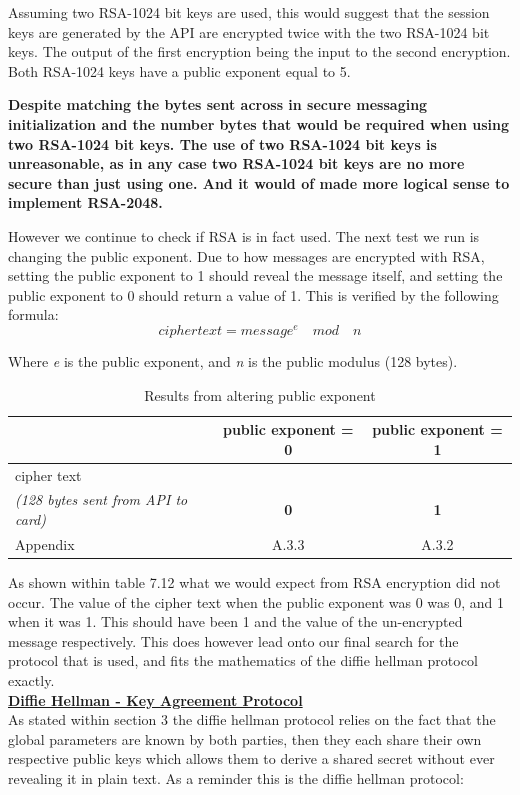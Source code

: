 \documentclass[bsc,frontabs,twoside,singlespacing,parskip,deptreport]{infthesis}     %
\begin{document}
Assuming two RSA-1024 bit keys are used, this would suggest that the session keys are generated by the API are encrypted twice with the two RSA-1024 bit keys. The output of the first encryption being the input to the second encryption. Both RSA-1024 keys have a public exponent equal to 5. 

\textbf{Despite matching the bytes sent across in secure messaging initialization and the number bytes that would be required when using two RSA-1024 bit keys. The use of two RSA-1024 bit keys is unreasonable, as in any case two RSA-1024 bit keys are no more secure than just using one. And it would of made more logical sense to implement RSA-2048.}

However we continue to check if RSA is in fact used. The next test we run is changing the public exponent. Due to how messages are encrypted with RSA, setting the public exponent to 1 should reveal the message itself, and setting the public exponent to 0 should return a value of 1. This is verified by the following formula:\\

$$ ciphertext = message^{e} \quad mod \quad n $$

Where \textit{e} is the public exponent, and \textit{n} is the public modulus (128 bytes).\\


\begin{table}[H]
\begin{tabular}{|l|c|c|}
\hline
& public exponent = 0 & public exponent = 1\\
\hline
cipher text & &\\
\textit{(128 bytes sent from API to card)} & \textbf{0} & \textbf{1} \\

\hline
Appendix & A.3.3 & A.3.2 \\
\hline
\end{tabular}
\caption{Results from altering public exponent}
\end{table}

As shown within table 7.12 what we would expect from RSA encryption did not occur. The value of the cipher text when the public exponent was 0 was 0, and 1 when it was 1. This should have been 1 and the value of the un-encrypted message respectively. This does however lead onto our final search for the protocol that is used, and fits the mathematics of the diffie hellman protocol exactly.\\

\underline{\textbf{Diffie Hellman - Key Agreement Protocol}}\\
As stated within section 3 the diffie hellman protocol relies on the fact that the global parameters are known by both parties, then they each share their own respective public keys which allows them to derive a shared secret without ever revealing it in plain text. As a reminder this is the diffie hellman protocol:\\
\end{document}
